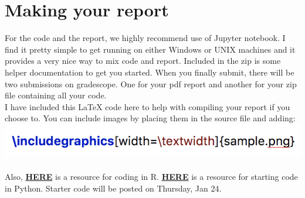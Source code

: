 \documentclass[12pt]{article}
\begin{document}
\section*{Making your report}
For the code and the report, we highly recommend use of Jupyter notebook. I find it pretty simple to get running on either Windows or UNIX machines and it provides a very nice way to mix code and report. Included in the zip is some helper documentation to get you started.
When you finally submit, there will be two submissions on gradescope. One for your pdf report and another for your zip file containing all your code.
\\
I have included this LaTeX code here to help with compiling your report if you choose to. You can include images by placing them in the source file and adding:\\
\includegraphics{sample.png}
\\
\\
Also, \href{https://www.datacamp.com/community/tutorials/machine-learning-in-r}{\textbf{HERE}} is a resource for coding in R. \href{https://scikit-learn.org/stable/modules/neighbors.html}{\textbf{HERE}} is a resource for starting code in Python. Starter code will be posted on Thursday, Jan 24.
\end{document}
